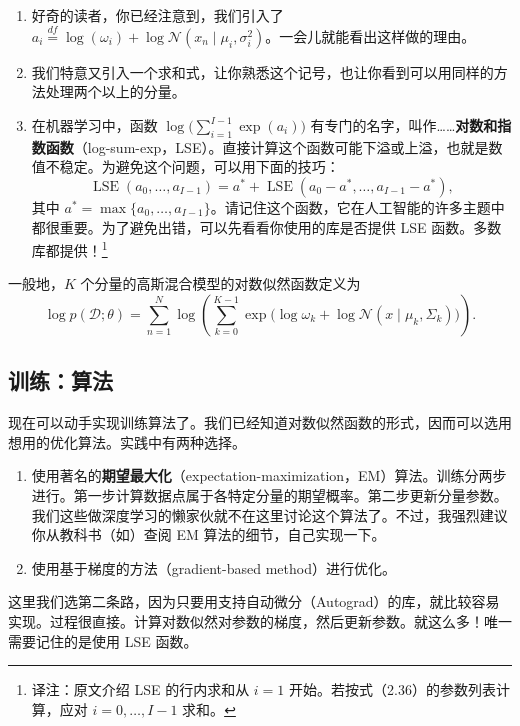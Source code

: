 \begin{enumerate}
\item 好奇的读者，你已经注意到，我们引入了 $a_i\overset{\mathit{df}}{=}\log(\omega_i)+\log\mathcal{N}(x_n\mid\mu_i,\sigma_i^2)$。一会儿就能看出这样做的理由。
\item 我们特意又引入一个求和式，让你熟悉这个记号，也让你看到可以用同样的方法处理两个以上的分量。
\item 在机器学习中，函数 $\log\!\bigl(\sum_{i=1}^{I-1}\exp(a_i)\bigr)$ 有专门的名字，叫作……\textbf{对数和指数函数}（log-sum-exp，LSE）。直接计算这个函数可能下溢或上溢，也就是数值不稳定。为避免这个问题，可以用下面的技巧：
\begin{equation}
\operatorname{LSE}(a_0,\ldots,a_{I-1})
=a^*+\operatorname{LSE}(a_0-a^*,\ldots,a_{I-1}-a^*),
\tag{2.36}\label{eq:02-36}
\end{equation}
其中 $a^*=\max\{a_0,\ldots,a_{I-1}\}$。请记住这个函数，它在人工智能的许多主题中都很重要。为了避免出错，可以先看看你使用的库是否提供 LSE 函数。多数库都提供！\footnote{译注：原文介绍 LSE 的行内求和从 $i=1$ 开始。若按式（2.36）的参数列表计算，应对 $i=0,\ldots,I-1$ 求和。}
\end{enumerate}
一般地，$K$ 个分量的高斯混合模型的对数似然函数定义为
\begin{equation}
\log p(\mathcal{D};\theta)
=\sum_{n=1}^{N}\log\left(\sum_{k=0}^{K-1}
       \exp\bigl(\log\omega_k+\log\mathcal{N}(x\mid\mu_k,\Sigma_k)\bigr)\right).
\tag{2.37}\label{eq:02-37}
\end{equation}

\subsection{训练：算法}
现在可以动手实现训练算法了。我们已经知道对数似然函数的形式，因而可以选用想用的优化算法。实践中有两种选择。
\begin{enumerate}
\item 使用著名的\textbf{期望最大化}（expectation-maximization，EM）算法。训练分两步进行。第一步计算数据点属于各特定分量的期望概率。第二步更新分量参数。我们这些做深度学习的懒家伙就不在这里讨论这个算法了。不过，我强烈建议你从教科书（如）查阅 EM 算法的细节，自己实现一下。
\item 使用基于梯度的方法（gradient-based method）进行优化。
\end{enumerate}
这里我们选第二条路，因为只要用支持自动微分（Autograd）的库，就比较容易实现。过程很直接。计算对数似然对参数的梯度，然后更新参数。就这么多！唯一需要记住的是使用 LSE 函数。

